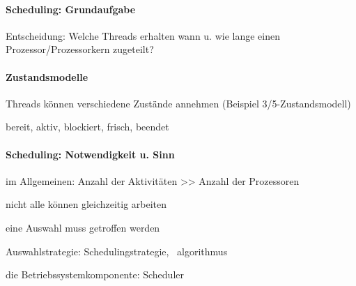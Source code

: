 \documentclass[a4pape]{article}
\begin{document}
\begin{multicols}{3}
  \paragraph{Scheduling: Grundaufgabe}
  Entscheidung: Welche Threads erhalten wann u. wie lange einen Prozessor/Prozessorkern zugeteilt?

  \paragraph{Zustandsmodelle}
  \begin{itemize*}
    \item Threads können verschiedene Zustände annehmen (Beispiel 3/5-Zustandsmodell)
    \item bereit, aktiv, blockiert, frisch, beendet
  \end{itemize*}

  \paragraph{Scheduling: Notwendigkeit u. Sinn}
  \begin{itemize*}
    \item im Allgemeinen: Anzahl der Aktivitäten >> Anzahl der Prozessoren
    \item nicht alle können gleichzeitig arbeiten
    \item eine Auswahl muss getroffen werden
    \item Auswahlstrategie: Schedulingstrategie, ~algorithmus
    \item die Betriebssystemkomponente: Scheduler
  \end{itemize*}


\end{multicols}
\end{document}
